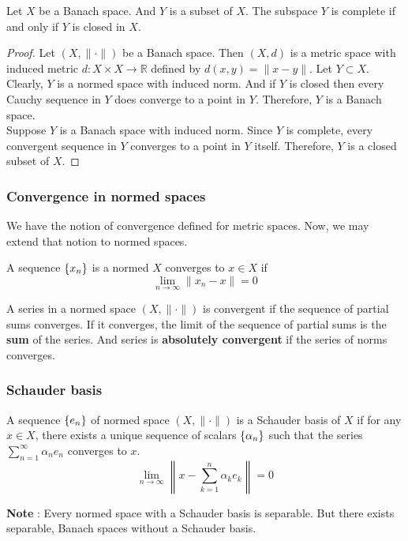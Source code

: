 \begin{theorem}
	Let $X$ be a Banach space.
	And $Y$ is a subset of $X$.
	The subspace $Y$ is complete if and only if $Y$ is closed in $X$.
\end{theorem}
\begin{proof}
	Let $(X,\|\cdot\|)$ be a Banach space.
	Then $(X,d)$ is a metric space with induced metric $d : X \times X \to \mathbb{R}$ defined by $d(x,y) = \| x-y \|$.
	Let $Y \subset X$.
	Clearly, $Y$ is a normed space with induced norm.
	And if $Y$ is closed then every Cauchy sequence in $Y$ does converge to a point in $Y$.
	Therefore, $Y$ is a Banach space.\\

	Suppose $Y$ is a Banach space with induced norm.
	Since $Y$ is complete, every convergent sequence in $Y$ converges to a point in $Y$ itself.
	Therefore, $Y$ is a closed subset of $X$.
\end{proof}

\subsubsection{Convergence in normed spaces}
We have the notion of convergence defined for metric spaces.
Now, we may extend that notion to normed spaces.
\begin{definition}[convergence]
	A sequence $\left\{x_n\right\}$ is a normed $X$ converges to $x \in X$ if
	\[ \lim_{n \to \infty} \| x_n-x \| = 0 \]
\end{definition}

A series in a normed space $(X,\|\cdot\|)$ is convergent if the sequence of partial sums converges.
If it converges, the limit of the sequence of partial sums is the \textbf{sum} of the series.
And series is \textbf{absolutely convergent} if the series of norms converges.
\subsubsection{Schauder basis}
\begin{definition}
	A sequence $\left\{e_n\right\}$ of normed space $(X,\|\cdot\|)$ is a Schauder basis of $X$ if for any $x  \in X$, there exists a unique sequence of scalars $\left\{\alpha_n\right\}$ such that the series $\displaystyle \sum_{n = 1}^\infty \alpha_n e_n$ converges to $x$.
	\[ \lim_{n \to \infty} \left\| x - \sum_{k = 1}^n \alpha_k e_k \right\| = 0 \]
\end{definition}

\textbf{Note} : Every normed space with a Schauder basis is separable.
But there exists separable, Banach spaces without a Schauder basis.

